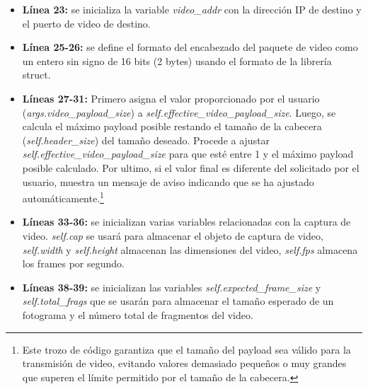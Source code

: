\begin{itemize}
    \item \textbf{Línea 23:} se inicializa la variable \textit{video\_addr} con la dirección IP de destino y el puerto de video de destino.
    \item \textbf{Línea 25-26:} se define el formato del encabezado del paquete de video como un entero sin signo de 16 bits (2 bytes) usando el formato de la librería struct. 
    \item \textbf{Líneas 27-31:} Primero asigna el valor proporcionado por el usuario (\textit{args.video\_payload\_size}) a \textit{self.effective\_video\_payload\_size}. Luego, se calcula el máximo payload posible restando el tamaño de la cabecera (\textit{self.header\_size}) del tamaño deseado. Procede a ajustar \textit{self.effective\_video\_payload\_size} para que esté entre 1 y el máximo payload posible calculado. Por ultimo, si el valor final es diferente del solicitado por el usuario, muestra un mensaje de aviso indicando que se ha ajustado automáticamente.\footnote{Este trozo de código garantiza que el tamaño del payload sea válido para la transmisión de video, evitando valores demasiado pequeños o muy grandes que superen el límite permitido por el tamaño de la cabecera.}
    \item \textbf{Líneas 33-36:} se inicializan varias variables relacionadas con la captura de video. \textit{self.cap} se usará para almacenar el objeto de captura de video, \textit{self.width} y \textit{self.height} almacenan las dimensiones del video, \textit{self.fps} almacena los frames por segundo.
    \item \textbf{Líneas 38-39:} se inicializan las variables \textit{self.expected\_frame\_size} y \textit{self.total\_frags} que se usarán para almacenar el tamaño esperado de un fotograma y el número total de fragmentos del video.
\end{itemize}

\vspace{\baselineskip}

